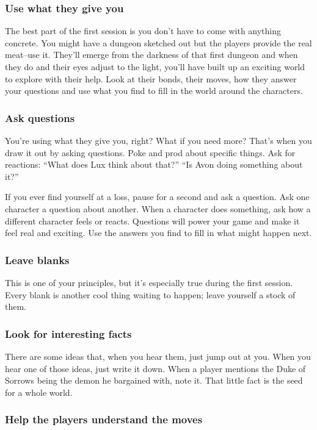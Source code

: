 \subsubsection{Use what they give you}


The best part of the first session is you don't have to come with anything concrete. You might have a dungeon sketched out but the players provide the real meat--use it. They'll emerge from the darkness of that first dungeon and when they do and their eyes adjust to the light, you'll have built up an exciting world to explore with their help. Look at their bonds, their moves, how they answer your questions and use what you find to fill in the world around the characters.
\subsubsection{Ask questions}


You're using what they give you, right? What if you need more? That's when you draw it out by asking questions. Poke and prod about specific things. Ask for reactions: ``What does Lux think about that?'' ``Is Avon doing something about it?''


If you ever find yourself at a loss, pause for a second and ask a question. Ask one character a question about another. When a character does something, ask how a different character feels or reacts. Questions will power your game and make it feel real and exciting. Use the answers you find to fill in what might happen next.
\subsubsection{Leave blanks}


This is one of your principles, but it's especially true during the first session. Every blank is another cool thing waiting to happen; leave yourself a stock of them.
\subsubsection{Look for interesting facts}


There are some ideas that, when you hear them, just jump out at you. When you hear one of those ideas, just write it down. When a player mentions the Duke of Sorrows being the demon he bargained with, note it. That little fact is the seed for a whole world.
\subsubsection{Help the players understand the moves}


